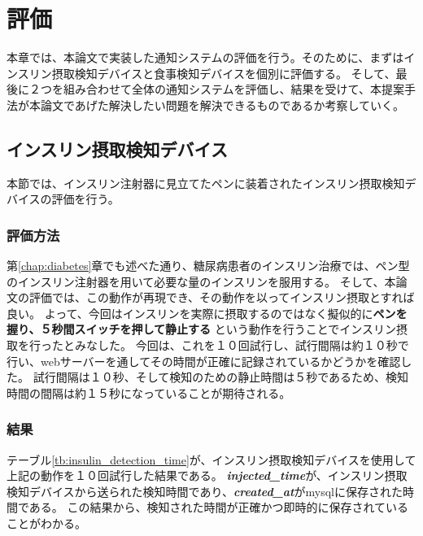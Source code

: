 \chapter{評価}
\label{chap:evaluation}

本章では、本論文で実装した通知システムの評価を行う。そのために、まずはインスリン摂取検知デバイスと食事検知デバイスを個別に評価する。
そして、最後に２つを組み合わせて全体の通知システムを評価し、結果を受けて、本提案手法が本論文であげた解決したい問題を解決できるものであるか考察していく。

\section{インスリン摂取検知デバイス}
本節では、インスリン注射器に見立てたペンに装着されたインスリン摂取検知デバイスの評価を行う。

\subsection{評価方法}
第\ref{chap:diabetes}章でも述べた通り、糖尿病患者のインスリン治療では、ペン型のインスリン注射器を用いて必要な量のインスリンを服用する。
そして、本論文の評価では、この動作が再現でき、その動作を以ってインスリン摂取とすれば良い。
よって、今回はインスリンを実際に摂取するのではなく擬似的に\textbf{ペンを握り、５秒間スイッチを押して静止する}\cite{how_to_inject_insulin_1}\cite{how_to_inject_insulin_2}
という動作を行うことでインスリン摂取を行ったとみなした。
今回は、これを１０回試行し、試行間隔は約１０秒で行い、webサーバーを通してその時間が正確に記録されているかどうかを確認した。
試行間隔は１０秒、そして検知のための静止時間は５秒であるため、検知時間の間隔は約１５秒になっていることが期待される。

\subsection{結果}

テーブル\ref{tb:insulin_detection_time}が、インスリン摂取検知デバイスを使用して上記の動作を１０回試行した結果である。
\textbf{\textit{injected\_time}}が、インスリン摂取検知デバイスから送られた検知時間であり、\textbf{\textit{created\_at}}がmysqlに保存された時間である。
この結果から、検知された時間が正確かつ即時的に保存されていることがわかる。

\newpage

